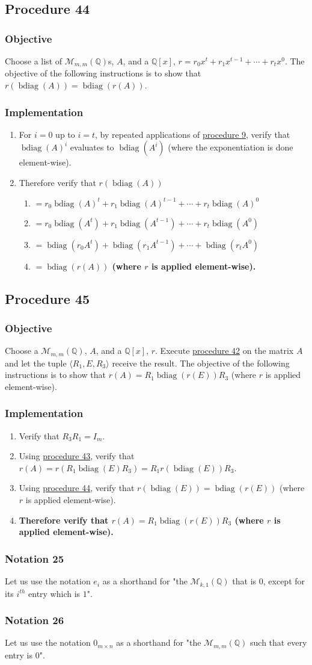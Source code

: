 \documentclass[twocolumn]{article}
\DeclareMathOperator{\bdiag}{bdiag}
\newcommand{\notation}[1]{\subsubsection*{Notation #1}}
\newcommand{\procedure}[2][]{\subsection*{Procedure #2 \ifthenelse{\equal{#1}{}}{}{(#1)}}\label{sec:procedure #2}}
\newcommand{\objective}{\subsubsection*{Objective}}
\newcommand{\implementation}{\subsubsection*{Implementation}}
\begin{document}
		\procedure{44}
			\objective
				Choose a list of $\mathcal{M}_{m,m}(\mathbb{Q})$s, $A$, and a $\mathbb{Q}[x]$, $r=r_0x^t+r_1x^{t-1}+\cdots+r_tx^0$. The objective of the following instructions is to show that $r(\bdiag(A))=\bdiag(r(A))$.
			\implementation
				\begin{enumerate}
					\item For $i=0$ up to $i=t$, by repeated applications of \hyperref[sec:procedure 9]{procedure 9}, verify that $\bdiag(A)^i$ evaluates to $\bdiag(A^i)$ (where the exponentiation is done element-wise).
					\item Therefore verify that $r(\bdiag(A))$
					\begin{enumerate}
						\item $=r_0\bdiag(A)^t+r_1\bdiag(A)^{t-1}+\cdots+r_t\bdiag(A)^0$
						\item $=r_0\bdiag(A^t)+r_1\bdiag(A^{t-1})+\cdots+r_t\bdiag(A^0)$
						\item $=\bdiag(r_0A^t)+\bdiag(r_1A^{t-1})+\cdots+\bdiag(r_tA^0)$
						\item \textbf{$=\bdiag(r(A))$ (where $r$ is applied element-wise).}
					\end{enumerate}
				\end{enumerate}
		\procedure{45}
			\objective
				Choose a $\mathcal{M}_{m,m}(\mathbb{Q})$, $A$, and a $\mathbb{Q}[x]$, $r$. Execute \hyperref[sec:procedure 42]{procedure 42} on the matrix $A$ and let the tuple $\langle R_1,E,R_3\rangle$ receive the result. The objective of the following instructions is to show that $r(A)=R_1\bdiag(r(E))R_3$ (where $r$ is applied element-wise).
			\implementation
				\begin{enumerate}
					\item Verify that $R_3R_1=I_m$.
					\item Using \hyperref[sec:procedure 43]{procedure 43}, verify that $r(A)=r(R_1\bdiag(E)R_3)=R_1r(\bdiag(E))R_3$.
					\item Using \hyperref[sec:procedure 44]{procedure 44}, verify that $r(\bdiag(E))=\bdiag(r(E))$ (where $r$ is applied element-wise).
					\item \textbf{Therefore verify that $r(A)=R_1\bdiag(r(E))R_3$ (where $r$ is applied element-wise).}
				\end{enumerate}
		\notation{25}
			Let us use the notation $e_i$ as a shorthand for "the $\mathcal{M}_{k,1}(\mathbb{Q})$ that is $0$, except for its $i^{th}$ entry which is $1$".
		\notation{26}
			Let us use the notation $0_{m\times n}$ as a shorthand for "the $\mathcal{M}_{m,m}(\mathbb{Q})$ such that every entry is $0$".
\end{document}
